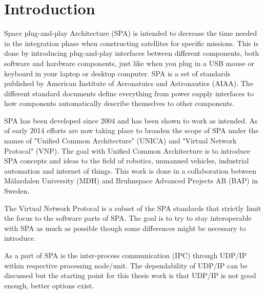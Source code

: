 \chapter{Introduction}
Space plug-and-play Architecture (SPA) is intended to decrease the time needed in
the integration phase when constructing satellites for specific missions. This
is done by introducing plug-and-play interfaces between different components,
both software and hardware components, just like when you plug in a USB mouse
or keyboard in your laptop or desktop computer. SPA is a set of standards
published by American Institute of Aeronatuics and Astronautics (AIAA). The
different standard documents define everything from power supply interfaces to
how components automatically describe themselves to other components.


SPA has been developed since 2004 and has been shown to work as intended. As of
early 2014 efforts are now taking place to broaden the scope of SPA under the
names of "Unified Common Architecture" (UNICA) and "Virtual Network Protocal"
(VNP). The goal with Unified Common Architecture is to introduce SPA concepts
and ideas to the field of robotics, unmanned vehicles, industrial automation
and internet of things. This work is done in a collaboration between
M\"{a}lardalen University (MDH) and Bruhnspace Advanced Projects AB (BAP) in
Sweden.


The Virtual Network Protocal is a subset of the SPA standards that
strictly limit the focus to the software parts of SPA. The goal is to try to
stay interoperable with SPA as much as possible though some differences might
be necessary to introduce.

As a part of SPA is the inter-process communication (IPC)
through UDP/IP within respective processing node/unit. The dependability of
UDP/IP can be discussed but the starting point for this thesis work is that
UDP/IP is not good enough, better options exist.

